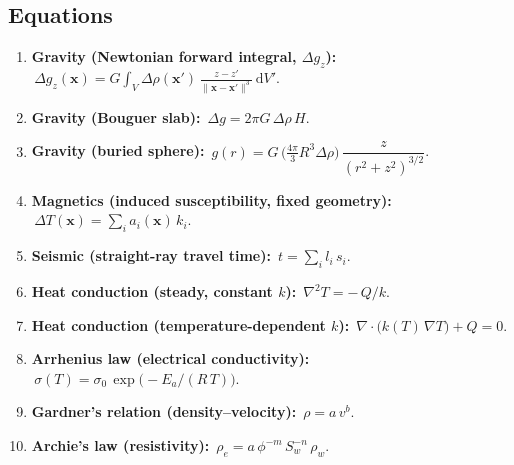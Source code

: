\subsection*{Equations}
\begin{enumerate}[label=Q\arabic*.,itemsep=6pt]
  \item \textbf{Gravity (Newtonian forward integral, $\Delta g_z$):}
  $\,\displaystyle \Delta g_z(\mathbf{x}) = G \int_V \Delta\rho(\mathbf{x}')\,\frac{z - z'}{\lVert\mathbf{x}-\mathbf{x}'\rVert^3}\,\mathrm{d}V'$.

  \item \textbf{Gravity (Bouguer slab):}
  $\,\displaystyle \Delta g = 2\pi G\,\Delta\rho\,H$.

  \item \textbf{Gravity (buried sphere):}
  $\,\displaystyle g(r) = G\,\Big(\tfrac{4\pi}{3}R^3\Delta\rho\Big)\,\dfrac{z}{(r^2+z^2)^{3/2}}$.

  \item \textbf{Magnetics (induced susceptibility, fixed geometry):}
  $\,\displaystyle \Delta T(\mathbf{x}) = \sum_i a_i(\mathbf{x})\,k_i$.

  \item \textbf{Seismic (straight-ray travel time):}
  $\,\displaystyle t = \sum_i l_i\,s_i$.

  \item \textbf{Heat conduction (steady, constant $k$):}
  $\,\displaystyle \nabla^2 T = -\,Q/k$.

  \item \textbf{Heat conduction (temperature-dependent $k$):}
  $\,\displaystyle \nabla\!\cdot\!\big(k(T)\,\nabla T\big)+Q=0$.

  \item \textbf{Arrhenius law (electrical conductivity):}
  $\,\displaystyle \sigma(T) = \sigma_0\,\exp\!\big(-E_a/(R\,T)\big)$.

  \item \textbf{Gardner's relation (density--velocity):}
  $\,\displaystyle \rho = a\,v^b$.

  \item \textbf{Archie's law (resistivity):}
  $\,\displaystyle \rho_e = a\,\phi^{-m}\,S_w^{-n}\,\rho_w$.
\end{enumerate}

